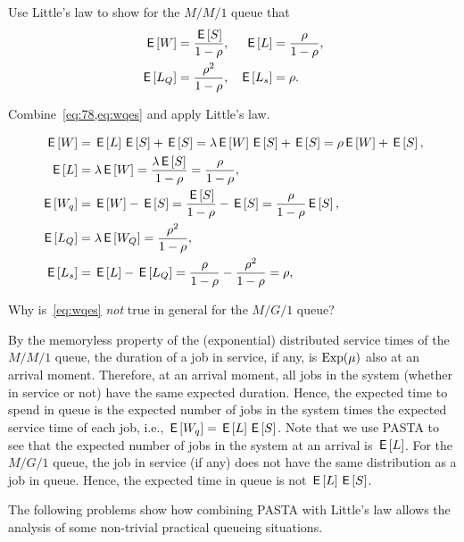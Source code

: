 \begin{exercise}
Use Little's law to show for the $M/M/1$ queue that 
 \begin{align*}
 \,\mathsf{E}\left[W\right] &= \frac{\,\mathsf{E}\left[S\right]}{1-\rho}, & \,\mathsf{E}\left[L\right] &= \frac\rho{1-\rho}, \\
 \,\mathsf{E}\left[L_Q\right] &= \frac{\rho^2}{1-\rho}, & \,\mathsf{E}\left[L_s\right] &= \rho.
 \end{align*}
\begin{hint}
 Combine~\cref{eq:78,eq:wqes} and apply Little's law. 
\end{hint}
\begin{solution}
\begin{align*}
 \,\mathsf{E}\left[W\right] &= \,\mathsf{E}\left[L\right] \,\mathsf{E}\left[S\right] + \,\mathsf{E}\left[S\right] = \lambda \,\mathsf{E}\left[W\right] \,\mathsf{E}\left[S\right] + \,\mathsf{E}\left[S\right]= \rho \,\mathsf{E}\left[W\right] + \,\mathsf{E}\left[S\right], \\
 \,\mathsf{E}\left[L\right] &= \lambda \,\mathsf{E}\left[W\right] = \frac{\lambda \,\mathsf{E}\left[S\right]}{1-\rho} = \frac\rho{1-\rho}, \\
 \,\mathsf{E}\left[W_q\right] &= \,\mathsf{E}\left[W\right] - \,\mathsf{E}\left[S\right] = \frac{\,\mathsf{E}\left[S\right]}{1-\rho} - \,\mathsf{E}\left[S\right] = \frac{\rho}{1-\rho} \,\mathsf{E}\left[S\right],\\
 \,\mathsf{E}\left[L_Q\right] &= \lambda \,\mathsf{E}\left[W_Q\right] = \frac{\rho^2}{1-\rho}, \\
 \,\mathsf{E}\left[L_s\right] &= \,\mathsf{E}\left[L\right] - \,\mathsf{E}\left[L_Q\right] = \frac{\rho}{1-\rho} - \frac{\rho^2}{1-\rho} = \rho, 
\end{align*}
\end{solution}
\end{exercise}

\begin{exercise}
Why is~\cref{eq:wqes} \emph{not} true in general for the $M/G/1$ queue? 
\begin{solution}
 By the memoryless property of the (exponential) distributed service times of the $M/M/1$ queue, the duration of a job in service, if any, is $\operatorname{Exp}(\mu)$ also at an arrival moment.
 Therefore, at an arrival moment, all jobs in the system (whether in service or not) have the same expected duration.
 Hence, the expected time to spend in queue is the expected number of jobs in the system times the expected service time of each job, i.e., $\,\mathsf{E}\left[W_q\right] = \,\mathsf{E}\left[L\right] \,\mathsf{E}\left[S\right]$.
 Note that we use PASTA to see that the expected number of jobs in the system at an arrival is $\,\mathsf{E}\left[L\right]$.
 For the $M/G/1$ queue, the job in service (if any) does not have the same distribution as a job in queue.
 Hence, the expected time in queue is not $\,\mathsf{E}\left[L\right] \,\mathsf{E}\left[S\right]$.
\end{solution}
\end{exercise}


The following problems show how combining PASTA with Little's law allows the analysis of some non-trivial practical queueing situations.

